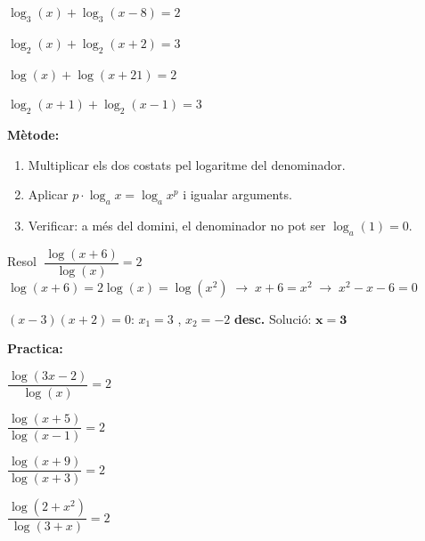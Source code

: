 \documentclass[12pt,a4paper]{article}
\begin{document}
\begin{exercicis}
    \item $\log_3(x) + \log_3(x-8) = 2$
    \item $\log_2(x) + \log_2(x+2) = 3$
    \item $\log(x) + \log(x+21) = 2$
    \item $\log_2(x+1) + \log_2(x-1) = 3$
\end{exercicis}

\newpage


\begin{metodebox}
\textbf{Mètode:}
\begin{enumerate}[noitemsep, label=\arabic*.]
    \item Multiplicar els dos costats pel logaritme del denominador.
    \item Aplicar $p \cdot \log_a x = \log_a x^p$ i igualar arguments.
    \item Verificar: a més del domini, el denominador no pot ser $\log_a(1) = 0$.
\end{enumerate}
\end{metodebox}

\vspace{0.2cm}

\begin{tcolorbox}[exemplebox]
Resol $\;\dfrac{\log(x+6)}{\log(x)} = 2$
\tcblower
$\log(x+6) = 2\log(x) = \log(x^2) \;\longrightarrow\; x+6=x^2 \;\longrightarrow\; x^2-x-6=0$

$(x-3)(x+2)=0$: \; $x_1=3$ \checkmark, \; $x_2=-2$ \textbf{desc.} \quad Solució: $\boldsymbol{x=3}$
\end{tcolorbox}

\vspace{0.3cm}
\noindent\textbf{Practica:}

\begin{exercicis}
    \item $\dfrac{\log(3x-2)}{\log(x)} = 2$
    \item $\dfrac{\log(x+5)}{\log(x-1)} = 2$
    \item $\dfrac{\log(x+9)}{\log(x+3)} = 2$
    \item $\dfrac{\log(2+x^2)}{\log(3+x)} = 2$
\end{exercicis}
\end{document}
